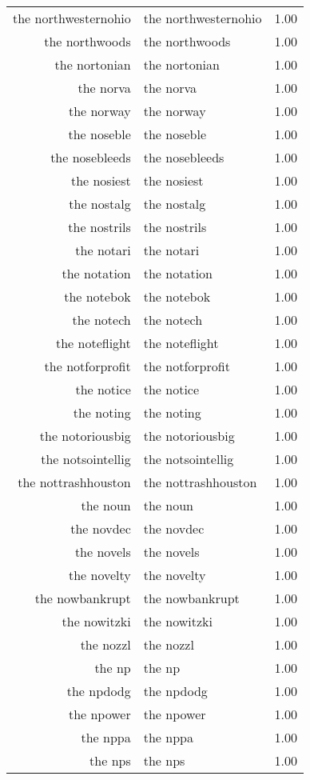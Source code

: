 \begin{table}[ht]
\begin{tabular}{rlr}
  the northwesternohio & the northwesternohio & 1.00 \\ 
  the northwoods & the northwoods & 1.00 \\ 
  the nortonian & the nortonian & 1.00 \\ 
  the norva & the norva & 1.00 \\ 
  the norway & the norway & 1.00 \\ 
  the noseble & the noseble & 1.00 \\ 
  the nosebleeds & the nosebleeds & 1.00 \\ 
  the nosiest & the nosiest & 1.00 \\ 
  the nostalg & the nostalg & 1.00 \\ 
  the nostrils & the nostrils & 1.00 \\ 
  the notari & the notari & 1.00 \\ 
  the notation & the notation & 1.00 \\ 
  the notebok & the notebok & 1.00 \\ 
  the notech & the notech & 1.00 \\ 
  the noteflight & the noteflight & 1.00 \\ 
  the notforprofit & the notforprofit & 1.00 \\ 
  the notice & the notice & 1.00 \\ 
  the noting & the noting & 1.00 \\ 
  the notoriousbig & the notoriousbig & 1.00 \\ 
  the notsointellig & the notsointellig & 1.00 \\ 
  the nottrashhouston & the nottrashhouston & 1.00 \\ 
  the noun & the noun & 1.00 \\ 
  the novdec & the novdec & 1.00 \\ 
  the novels & the novels & 1.00 \\ 
  the novelty & the novelty & 1.00 \\ 
  the nowbankrupt & the nowbankrupt & 1.00 \\ 
  the nowitzki & the nowitzki & 1.00 \\ 
  the nozzl & the nozzl & 1.00 \\ 
  the np & the np & 1.00 \\ 
  the npdodg & the npdodg & 1.00 \\ 
  the npower & the npower & 1.00 \\ 
  the nppa & the nppa & 1.00 \\ 
  the nps & the nps & 1.00 \\ 

\end{tabular}
\end{table}
